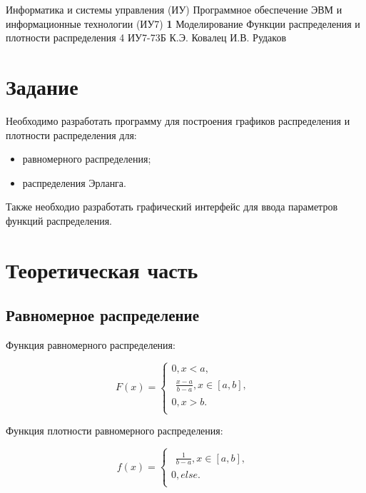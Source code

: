 \documentclass{bmstu}
\begin{document}
\makereporttitle
{Информатика и системы управления (ИУ)}
{Программное обеспечение ЭВМ и информационные технологии (ИУ7)}
{\textbf{1}}
{Моделирование}
{Функции распределения и плотности распределения}
{4}
{ИУ7-73Б}
{К.Э. Ковалец}
{И.В. Рудаков}


\setcounter{page}{2}
\renewcommand{\contentsname}{Содержание} 
\tableofcontents

\chapter{Задание}

Необходимо разработать программу для построения графиков распределения и плотности распределения для:

\begin{itemize}
    \item равномерного распределения;
    \item распределения Эрланга.
\end{itemize}

Также необходио разработать графический интерфейс для ввода параметров функций распределения.

\chapter{Теоретическая часть}

\section{Равномерное распределение}

Функция равномерного распределения:

\begin{equation}
    F(x) =
    \begin{cases}
            0, x < a, \\
            \begin{aligned}
                \frac{x -  a}{b - a}, x \in [a, b], 
            \end{aligned}\\
            0, x > b. \\
    \end{cases}
\end{equation}

Функция плотности равномерного распределения:

\begin{equation}
    f(x) =
    \begin{cases}
            \begin{aligned}
                \frac{1}{b - a}, x \in [a, b], 
            \end{aligned}\\
            0, else. \\
    \end{cases}
\end{equation}
\end{document}
